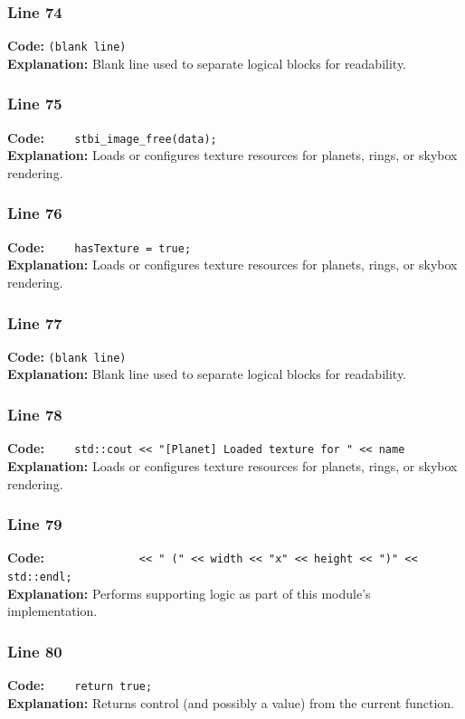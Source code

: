 \documentclass[11pt,a4paper]{article}
\begin{document}
\subsubsection*{Line 74}
\textbf{Code:} \texttt{(blank line)}\\
\textbf{Explanation:} Blank line used to separate logical blocks for readability.

\subsubsection*{Line 75}
\textbf{Code:} \verb|    stbi_image_free(data);|\\
\textbf{Explanation:} Loads or configures texture resources for planets, rings, or skybox rendering.

\subsubsection*{Line 76}
\textbf{Code:} \verb|    hasTexture = true;|\\
\textbf{Explanation:} Loads or configures texture resources for planets, rings, or skybox rendering.

\subsubsection*{Line 77}
\textbf{Code:} \texttt{(blank line)}\\
\textbf{Explanation:} Blank line used to separate logical blocks for readability.

\subsubsection*{Line 78}
\textbf{Code:} \verb|    std::cout << "[Planet] Loaded texture for " << name|\\
\textbf{Explanation:} Loads or configures texture resources for planets, rings, or skybox rendering.

\subsubsection*{Line 79}
\textbf{Code:} \verb|              << " (" << width << "x" << height << ")" << std::endl;|\\
\textbf{Explanation:} Performs supporting logic as part of this module's implementation.

\subsubsection*{Line 80}
\textbf{Code:} \verb|    return true;|\\
\textbf{Explanation:} Returns control (and possibly a value) from the current function.
\end{document}
